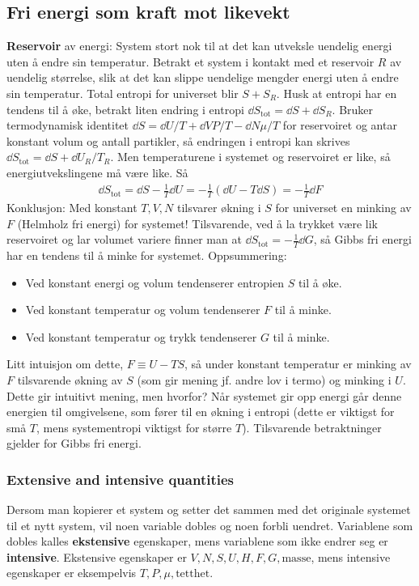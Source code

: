\documentclass[12pt]{article}
\begin{document}
\subsection{Fri energi som kraft mot likevekt}
\textbf{Reservoir} av energi: System stort nok til at det kan utveksle uendelig
energi uten å endre sin temperatur. \newline \noindent
Betrakt et system i kontakt med et reservoir $R$ av uendelig størrelse, slik at
det kan slippe uendelige mengder energi uten å endre sin temperatur. Total entropi
for universet blir $S + S_R$. Husk at entropi har en tendens til å øke, betrakt
liten endring i entropi $\dd S_\text{tot} = \dd S + \dd S_R$. Bruker termodynamisk identitet $\dd S = \dd U /T + \dd V P/T - \dd N \mu /T$
for reservoiret og antar konstant volum og antall partikler, så endringen i entropi kan skrives $\dd S_\text{tot} = \dd S + \dd U_R / T_R$.
Men temperaturene i systemet og reservoiret er like, så energiutvekslingene må være like. Så
\begin{align*}
  \dd S_\text{tot} = \dd S - \frac{1}{T} \dd U = - \frac{1}{T}(\dd U - T\dd S) = - \frac{1}{T} \dd F
\end{align*}
Konklusjon: Med konstant $T, V, N$ tilsvarer økning i $S$ for universet en minking
av $F$ (Helmholz fri energi) for systemet! Tilsvarende, ved å la trykket være lik reservoiret og
lar volumet variere finner man at $\dd S_\text{tot} = -\frac{1}{T}\dd G$, så Gibbs fri
energi har en tendens til å minke for systemet. Oppsummering:
\begin{itemize}
  \item Ved konstant energi og volum tendenserer entropien $S$ til å øke.
  \item Ved konstant temperatur og volum tendenserer $F$ til å minke.
  \item Ved konstant temperatur og trykk tendenserer $G$ til å minke.
\end{itemize}
Litt intuisjon om dette, $F \equiv U - TS$, så under konstant temperatur er minking av
$F$ tilsvarende økning av $S$ (som gir mening jf. andre lov i termo) og minking i $U$. Dette
gir intuitivt mening, men hvorfor? Når systemet gir opp energi går denne energien til
omgivelsene, som fører til en økning i entropi (dette er viktigst for små $T$, mens systementropi viktigst for større $T$).
Tilsvarende betraktninger gjelder for Gibbs fri energi.
\subsubsection{Extensive and intensive quantities}
Dersom man kopierer et system og setter det sammen med det originale systemet til
et nytt system, vil noen variable dobles og noen forbli uendret. Variablene som dobles
kalles \textbf{ekstensive} egenskaper, mens variablene som ikke endrer seg er \textbf{intensive}.
Ekstensive egenskaper er $V, N, S, U, H, F, G, \text{masse}$, mens intensive egenskaper er eksempelvis
$T, P, \mu, \text{tetthet}$.
\end{document}
